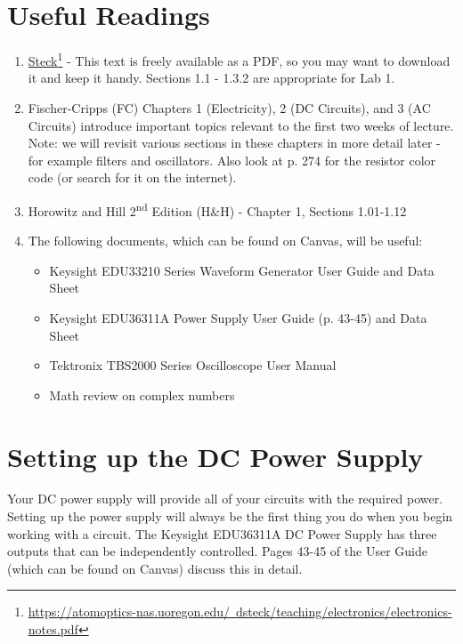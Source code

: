 \documentclass[10pt]{PhysLab1C} %
\begin{document}

\section{Useful Readings}

\begin{enumerate}
\item
 \href{https://atomoptics-nas.uoregon.edu/~dsteck/teaching/electronics/electronics-notes.pdf}{Steck}\footnote{\href{https://atomoptics-nas.uoregon.edu/~dsteck/teaching/electronics/electronics-notes.pdf}{https://atomoptics-nas.uoregon.edu/~dsteck/teaching/electronics/electronics-notes.pdf}} - 
  This text is freely available as a PDF, so you may want to download it and keep it handy.
  Sections 1.1 - 1.3.2 are appropriate for Lab 1.
\item
  Fischer-Cripps (FC) Chapters 1 (Electricity), 2 (DC Circuits), and 3
  (AC Circuits) introduce important topics relevant to the first two
  weeks of lecture. Note: we will revisit various sections in these
  chapters in more detail later - for example filters and oscillators.
  Also look at p. 274 for the resistor color code (or search for it on
  the internet).
\item
  Horowitz and Hill 2\textsuperscript{nd} Edition (H\&H) - Chapter 1, Sections 1.01-1.12
  \item
  The following documents, which can be found on Canvas, will be useful:

  \begin{itemize}
  \item
    Keysight EDU33210 Series Waveform Generator User Guide and Data
    Sheet
  \item
    Keysight EDU36311A Power Supply User Guide (p. 43-45) and Data Sheet
  \item
    Tektronix TBS2000 Series Oscilloscope User Manual
  \item
    Math review on complex numbers
  \end{itemize}
\end{enumerate}


\section{Setting up the DC Power Supply}

Your DC power supply will provide all of your circuits with the required
power. Setting up the power supply will always be the first thing you do
when you begin working with a circuit. The Keysight EDU36311A DC Power
Supply has three outputs that can be independently controlled. Pages
43-45 of the User Guide (which can be found on Canvas) discuss this in
detail.
\end{document}
